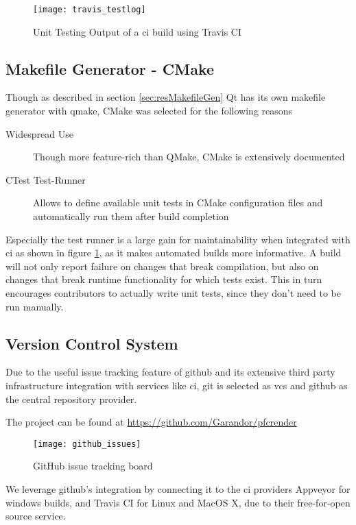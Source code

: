 \begin{figure}[htb]
	\texttt{[image: travis\_testlog]}
	\caption{Unit Testing Output of a \gls{ci} build using Travis CI}
	\label{fig:travistest}
\end{figure}

\subsection{Makefile Generator - CMake}
Though as described in section \ref{sec:resMakefileGen} Qt has its own makefile generator with qmake, CMake was selected for the following reasons
\begin{description}
	\item[Widespread Use] Though more feature-rich than QMake, CMake is extensively documented
	\item[CTest Test-Runner] Allows to define available unit tests in CMake configuration files and automatically run them after build completion 
\end{description}

Especially the test runner is a large gain for maintainability when integrated with \gls{ci} as shown in figure \ref{fig:travistest}, as it makes automated builds more informative.
A build will not only report failure on changes that break compilation, but also on changes that break runtime functionality for which tests exist. This in turn encourages contributors to actually write unit tests, since they don't need to be run manually.

\subsection{Version Control System}\label{sec:archvcs}
Due to the useful issue tracking feature of \gls{github} and its extensive third party infrastructure integration with services like \gls{ci}, \gls{git} is selected as \gls{vcs} and \gls{github} as the central repository provider.

The project can be found at \url{https://github.com/Garandor/pfcrender}

\begin{figure}[htb]
	\texttt{[image: github\_issues]}
	\caption{GitHub issue tracking board}
	\label{fig:githubissues}
\end{figure}

We leverage \gls{github}'s integration by connecting it to the \gls{ci} providers Appveyor for windows builds, and Travis CI for Linux and MacOS X, due to their free-for-open source service.

